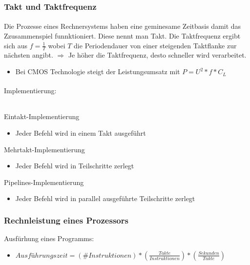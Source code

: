 		\subsubsection{Takt und Taktfrequenz}
		\paragraph{} Die Prozesse eines Rechnersystems haben eine geminesame Zeitbasis 
		damit das Zzusammenspiel funnktioniert. Diese nennt man Takt. Die Taktfrequenz
		ergibt sich aus $f = \frac{1}{T}$ wobei $T$ die Periodendauer von einer steigenden
		Taktflanke zur nächsten angibt. $\Longrightarrow$ Je höher die Taktfrequenz, desto
		schneller wird verarbeitet.
		\begin{itemize}
			\item Bei CMOS Technologie steigt der Leistungsumsatz mit $P = U^2 * f * C_L$
		\end{itemize}

		\paragraph{} Implementierung: \\ \mbox{} \\
		\begin{minipage}{0.33\textwidth}
			\centerline{Eintakt-Implementierung}
			\begin{itemize}
				\item Jeder Befehl wird in einem Takt ausgeführt
			\end{itemize}
		\end{minipage}
		\begin{minipage}{0.33\textwidth}
			\centerline{Mehrtakt-Implementierung}
			\begin{itemize}
				\item Jeder Befehl wird in Teilschritte zerlegt
			\end{itemize}
		\end{minipage}
		\begin{minipage}{0.33\textwidth}
			\centerline{Pipelines-Implementierung}
			\begin{itemize}
				\item Jeder Befehl wird in parallel ausgeführte Teilschritte zerlegt
			\end{itemize}
		\end{minipage}


		\subsubsection{Rechnleistung eines Prozessors}
		Ausfürhung eines Programms:
		\begin{itemize}
			\item$ Ausführungszeit = (\#Instruktionen) * (\frac{Takte}{Instruktionen}) * (\frac{Sekunden}{Takte})$ \\
		\end{itemize}

